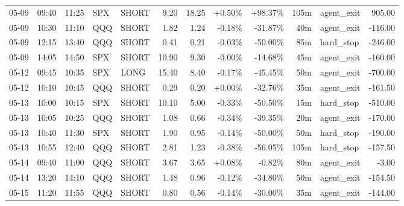 \documentclass[11pt,a4paper,twoside]{article}
\begin{document}
\begin{center}
\begin{longtable}{>{\color{txtmain}}l l l l l r r r r r >{\color{txtmain}}l r}
05-09 & 09:40 & 11:25 & SPX & SHORT & 9.20 & 18.25 & \textcolor{wingreen}{+0.50\%} & \textcolor{wingreen}{+98.37\%} & 105m & agent\_exit & \textcolor{wingreen}{905.00} \\
05-09 & 10:30 & 11:10 & QQQ & SHORT & 1.82 & 1.24 & \textcolor{lossred}{-0.18\%} & \textcolor{lossred}{-31.87\%} & 40m & agent\_exit & \textcolor{lossred}{-116.00} \\
05-09 & 12:15 & 13:40 & QQQ & SHORT & 0.41 & 0.21 & \textcolor{lossred}{-0.03\%} & \textcolor{lossred}{-50.00\%} & 85m & hard\_stop & \textcolor{lossred}{-246.00} \\
05-09 & 14:05 & 14:50 & SPX & SHORT & 10.90 & 9.30 & \textcolor{lossred}{-0.00\%} & \textcolor{lossred}{-14.68\%} & 45m & agent\_exit & \textcolor{lossred}{-160.00} \\
05-12 & 09:45 & 10:35 & SPX & LONG & 15.40 & 8.40 & \textcolor{lossred}{-0.17\%} & \textcolor{lossred}{-45.45\%} & 50m & agent\_exit & \textcolor{lossred}{-700.00} \\
05-12 & 10:10 & 10:45 & QQQ & SHORT & 0.29 & 0.20 & \textcolor{wingreen}{+0.00\%} & \textcolor{lossred}{-32.76\%} & 35m & agent\_exit & \textcolor{lossred}{-161.50} \\
05-13 & 10:00 & 10:15 & SPX & SHORT & 10.10 & 5.00 & \textcolor{lossred}{-0.33\%} & \textcolor{lossred}{-50.50\%} & 15m & hard\_stop & \textcolor{lossred}{-510.00} \\
05-13 & 10:05 & 10:25 & QQQ & SHORT & 1.08 & 0.66 & \textcolor{lossred}{-0.34\%} & \textcolor{lossred}{-39.35\%} & 20m & agent\_exit & \textcolor{lossred}{-170.00} \\
05-13 & 10:40 & 11:30 & SPX & SHORT & 1.90 & 0.95 & \textcolor{lossred}{-0.14\%} & \textcolor{lossred}{-50.00\%} & 50m & hard\_stop & \textcolor{lossred}{-190.00} \\
05-13 & 10:55 & 12:40 & QQQ & SHORT & 2.81 & 1.23 & \textcolor{lossred}{-0.38\%} & \textcolor{lossred}{-56.05\%} & 105m & hard\_stop & \textcolor{lossred}{-157.50} \\
05-14 & 09:40 & 11:00 & QQQ & SHORT & 3.67 & 3.65 & \textcolor{wingreen}{+0.08\%} & \textcolor{lossred}{-0.82\%} & 80m & agent\_exit & \textcolor{lossred}{-3.00} \\
05-14 & 13:20 & 14:10 & QQQ & SHORT & 1.48 & 0.96 & \textcolor{lossred}{-0.12\%} & \textcolor{lossred}{-34.80\%} & 50m & agent\_exit & \textcolor{lossred}{-154.50} \\
05-15 & 11:20 & 11:55 & QQQ & SHORT & 0.80 & 0.56 & \textcolor{lossred}{-0.14\%} & \textcolor{lossred}{-30.00\%} & 35m & agent\_exit & \textcolor{lossred}{-144.00} \\

\end{longtable}
\end{center}
\end{document}
